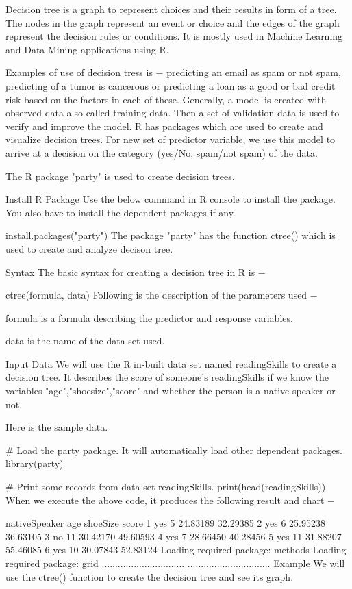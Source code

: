 Decision tree is a graph to represent choices and their results in form of a tree. The nodes in the graph represent an event or choice and the edges of the graph represent the decision rules or conditions. It is mostly used in Machine Learning and Data Mining applications using R.

Examples of use of decision tress is − predicting an email as spam or not spam, predicting of a tumor is cancerous or predicting a loan as a good or bad credit risk based on the factors in each of these. Generally, a model is created with observed data also called training data. Then a set of validation data is used to verify and improve the model. R has packages which are used to create and visualize decision trees. For new set of predictor variable, we use this model to arrive at a decision on the category (yes/No, spam/not spam) of the data.

The R package "party" is used to create decision trees.

Install R Package
Use the below command in R console to install the package. You also have to install the dependent packages if any.

install.packages("party")
The package "party" has the function ctree() which is used to create and analyze decison tree.

Syntax
The basic syntax for creating a decision tree in R is −

ctree(formula, data)
Following is the description of the parameters used −

formula is a formula describing the predictor and response variables.

data is the name of the data set used.

Input Data
We will use the R in-built data set named readingSkills to create a decision tree. It describes the score of someone's readingSkills if we know the variables "age","shoesize","score" and whether the person is a native speaker or not.

Here is the sample data.

# Load the party package. It will automatically load other dependent packages.
library(party)

# Print some records from data set readingSkills.
print(head(readingSkills))
When we execute the above code, it produces the following result and chart −

  nativeSpeaker   age   shoeSize      score
1           yes     5   24.83189   32.29385
2           yes     6   25.95238   36.63105
3            no    11   30.42170   49.60593
4           yes     7   28.66450   40.28456
5           yes    11   31.88207   55.46085
6           yes    10   30.07843   52.83124
Loading required package: methods
Loading required package: grid
...............................
...............................
Example
We will use the ctree() function to create the decision tree and see its graph.

